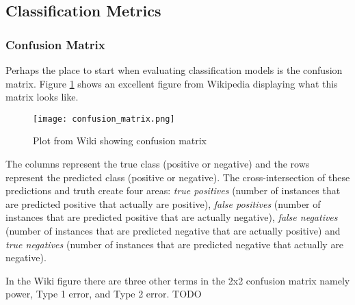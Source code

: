 \subsection{Classification Metrics}
\subsubsection{Confusion Matrix}
Perhaps the place to start when evaluating classification models is the confusion matrix. Figure \ref{fig:confusion} shows an excellent figure from Wikipedia displaying what this matrix looks like.

 \begin{figure}[h] \label{fig:confusion}
\caption{Plot from Wiki showing confusion matrix}
\centering
 \texttt{[image: confusion\_matrix.png]}
 \end{figure}
 
 The columns represent the true class (positive or negative) and the rows represent the predicted class (positive or negative). The cross-intersection of these predictions and truth create four areas: \emph{true positives} (number of instances that are predicted positive that actually are positive), \emph{false positives} (number of instances that are predicted positive that are actually negative), \emph{false negatives} (number of instances that are predicted negative that are actually positive) and \emph{true negatives} (number of instances that are predicted negative that actually are negative).
 
 In the Wiki figure there are three other terms in the 2x2 confusion matrix namely power, Type 1 error, and Type 2 error. TODO
 
 